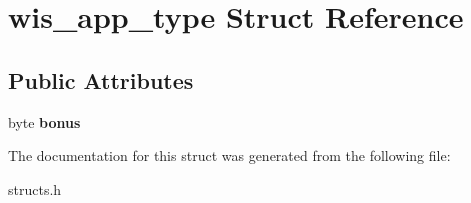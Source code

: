 \hypertarget{structwis__app__type}{}\section{wis\+\_\+app\+\_\+type Struct Reference}
\label{structwis__app__type}
\subsection*{Public Attributes}
\begin{DoxyCompactItemize}
\item 
\mbox{\label{structwis__app__type_aafcfe8969f313a601185464de4ff0001}} 
byte {\bfseries bonus}
\end{DoxyCompactItemize}


The documentation for this struct was generated from the following file\+:\begin{DoxyCompactItemize}
\item 
structs.\+h\end{DoxyCompactItemize}
